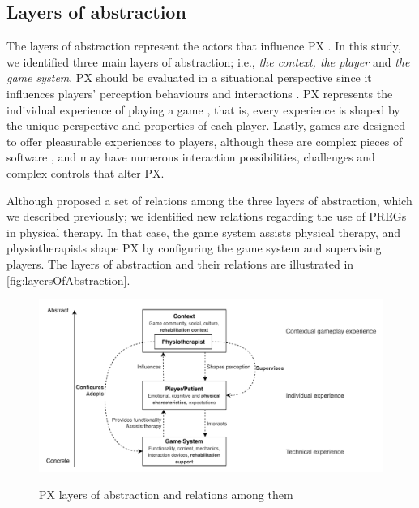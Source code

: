 \subsection{Layers of abstraction}
\label{sec:layers_abstraction}
The layers of abstraction represent the actors that influence \ac{PX} \autocite{Nacked,Nackea2,Engl2013,Elson2014}. In this study, we identified three main layers of abstraction; i.e., \textit{the context, the player} and \textit{the game system}. \ac{PX} should be evaluated in a situational perspective \autocite{Nacked,DeKort2007b} since it influences players' perception \autocite{Elson2014} behaviours and interactions \autocite{Engl2013,DeKort2007b}. \ac{PX} represents the individual experience of playing a game \autocite{Engl2013,Nackea2}, that is, every experience is shaped by the unique perspective \autocite{Fernandez2008} and properties \autocite{Nacked} of each player. Lastly, games are designed to offer pleasurable experiences to players, although these are complex pieces of software \autocite{Nackea}, and may have numerous interaction possibilities, challenges and complex controls \autocite{Nacked} that alter \ac{PX}.

Although \textcite{Nackea2} proposed a set of relations among the three layers of abstraction, which we described previously; we identified new relations regarding the use of \acp{PREG} in physical therapy. In that case, the game system assists physical therapy, and physiotherapists shape \ac{PX} by configuring the game system and supervising players. The layers of abstraction and their relations are illustrated in \autoref{fig:layersOfAbstraction}.

\begin{figure}[bth]
\myfloatalign
{\includegraphics[width=\linewidth]{gfx/model/layersOfAbstraction}} \quad
\caption{\ac{PX} layers of abstraction and relations among them} \label{fig:layersOfAbstraction}
\end{figure}


